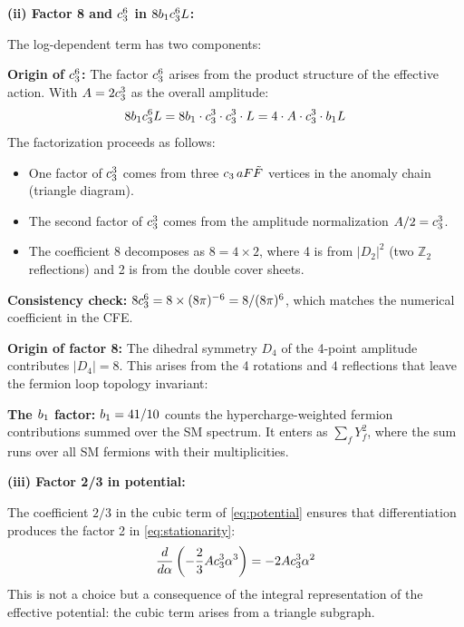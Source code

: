 \textbf{(ii) Factor 8 and $c_3^6$ in $8b_1c_3^6 L$:}

The log-dependent term has two components:

\textbf{Origin of $c_3^6$:} The factor $c_3^6$ arises from the product structure 
of the effective action. With $A = 2c_3^3$ as the overall amplitude:
\begin{equation}
    8b_1c_3^6 L = 8b_1 \cdot c_3^3 \cdot c_3^3 \cdot L
    = 4 \cdot A \cdot c_3^3 \cdot b_1 L
\end{equation}
The factorization proceeds as follows:
\begin{itemize}[leftmargin=1.5em, topsep=2pt, itemsep=1pt]
    \item One factor of $c_3^3$ comes from three $c_3\, aF\tilde{F}$ vertices 
        in the anomaly chain (triangle diagram).
    \item The second factor of $c_3^3$ comes from the amplitude normalization $A/2 = c_3^3$.
    \item The coefficient 8 decomposes as $8 = 4 \times 2$, where 4 is from $|D_2|^2$ 
        (two $\mathbb{Z}_2$ reflections) and 2 is from the double cover sheets.
\end{itemize}
\textbf{Consistency check:} $8c_3^6 = 8 \times (8\pi)^{-6} = 8/(8\pi)^6$, which matches 
the numerical coefficient in the CFE.

\textbf{Origin of factor 8:} The dihedral symmetry $D_4$ of the 4-point amplitude 
contributes $|D_4| = 8$. This arises from the 4 rotations and 4 reflections that 
leave the fermion loop topology invariant:
\begin{center}
\end{center}

\textbf{The $b_1$ factor:} $b_1 = 41/10$ counts the hypercharge-weighted fermion 
contributions summed over the SM spectrum. It enters as $\sum_f Y_f^2$, where the 
sum runs over all SM fermions with their multiplicities.

\textbf{(iii) Factor 2/3 in potential:}

The coefficient $2/3$ in the cubic term of \eqref{eq:potential} ensures that 
differentiation produces the factor 2 in \eqref{eq:stationarity}:
\begin{equation}
    \frac{d}{d\alpha}\left(-\frac{2}{3}Ac_3^3\alpha^3\right) = -2Ac_3^3\alpha^2
\end{equation}
This is not a choice but a consequence of the integral representation of the 
effective potential: the cubic term arises from a triangle subgraph.

